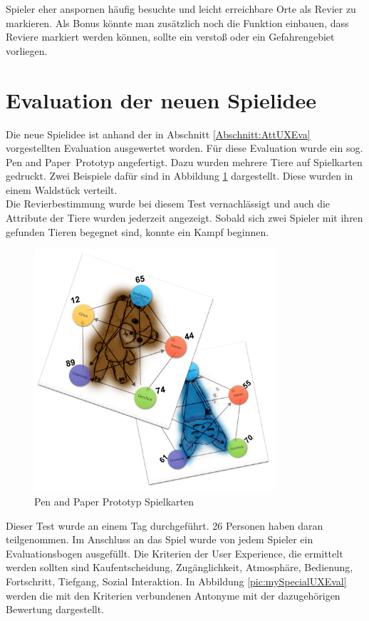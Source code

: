 Spieler eher anspornen häufig besuchte und leicht erreichbare Orte als Revier zu markieren. Als Bonus könnte man zusätzlich noch die Funktion einbauen, dass Reviere markiert werden können, sollte ein verstoß oder ein Gefahrengebiet vorliegen. 
\section{Evaluation der neuen Spielidee} 
\label{Abschnitt:EvaNeu}
Die neue Spielidee ist anhand der in Abschnitt \ref{Abschnitt:AttUXEva} vorgestellten Evaluation ausgewertet worden. Für diese Evaluation wurde ein sog. \glqq Pen and Paper\grqq\ Prototyp angefertigt. Dazu wurden mehrere Tiere auf Spielkarten gedruckt. Zwei Beispiele dafür sind in Abbildung \ref{pic:pnpPrototyp} dargestellt. Diese wurden in einem Waldstück verteilt. \\
Die Revierbestimmung wurde bei diesem Test vernachlässigt und auch die Attribute der Tiere wurden jederzeit angezeigt. Sobald sich zwei Spieler mit ihren gefunden Tieren begegnet sind, konnte ein Kampf beginnen. 
\begin{figure}[H]
    \centering
    \includegraphics[width=0.8\textwidth]{files/feldtest}
    \caption{Pen and Paper Prototyp Spielkarten}
    \label{pic:pnpPrototyp}
\end{figure}
 




Dieser Test wurde an einem Tag durchgeführt. 26 Personen haben daran teilgenommen. Im Anschluss an das Spiel wurde von jedem Spieler ein Evaluationsbogen ausgefüllt. Die Kriterien der User Experience, die ermittelt werden sollten sind Kaufentscheidung, Zugänglichkeit, Atmosphäre, Bedienung, Fortschritt, Tiefgang, Sozial Interaktion. In Abbildung \ref{pic:mySpecialUXEval} werden die mit den Kriterien verbundenen Antonyme mit der dazugehörigen Bewertung dargestellt. 



